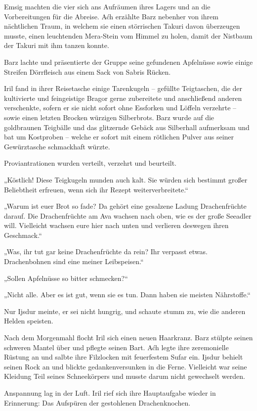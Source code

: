 Emsig machten die vier sich ans Aufräumen ihres Lagers und an die Vorbereitungen für die Abreise. Aćh erzählte Barz nebenher von ihrem nächtlichen Traum, in welchem sie einen störrischen Takuri davon überzeugen musste, einen leuchtenden Mera-Stein vom Himmel zu holen, damit der Nistbaum der Takuri mit ihm tanzen konnte.

Barz lachte und präsentierte der Gruppe seine gefundenen Apfelnüsse sowie einige Streifen Dörrfleisch aus einem Sack von Sabris Rücken.

Iril fand in ihrer Reisetasche einige Tarenkugeln – gefüllte Teigtaschen, die der kultivierte und feingeistige Bragor gerne zubereitete und anschließend anderen verschenkte, sofern er sie nicht sofort ohne Essforken und Löffeln verzehrte – sowie einen letzten Brocken würzigen Silberbrots. Barz wurde auf die goldbraunen Teigbälle und das glitzernde Gebäck aus Silberhall aufmerksam und bat um Kostproben – welche er sofort mit einem rötlichen Pulver aus seiner Gewürztasche schmackhaft würzte.

Proviantrationen wurden verteilt, verzehrt und beurteilt.

„Köstlich! Diese Teigkugeln munden auch kalt. Sie würden sich bestimmt großer Beliebtheit erfreuen, wenn sich ihr Rezept weiterverbreitete.“

„Warum ist euer Brot so fade? Da gehört eine gesalzene Ladung Drachenfrüchte darauf. Die Drachenfrüchte am Ava wachsen nach oben, wie es der große Seeadler will. Vielleicht wachsen eure hier nach unten und verlieren deswegen ihren Geschmack.“

„Was, ihr tut gar keine Drachenfrüchte da rein? Ihr verpasst etwas. Drachenbohnen sind eine meiner Leibspeisen.“

„Sollen Apfelnüsse so bitter schmecken?“

„Nicht alle. Aber es ist gut, wenn sie es tun. Dann haben sie meisten Nährstoffe.“

Nur Ijsdur meinte, er sei nicht hungrig, und schaute stumm zu, wie die anderen Helden speisten.

Nach dem Morgenmahl flocht Iril sich einen neuen Haarkranz. Barz stülpte seinen schweren Mantel über und pflegte seinen Bart. Aćh legte ihre zeremonielle Rüstung an und salbte ihre Filzlocken mit feuerfestem Sufar ein. Ijsdur behielt seinen Rock an und blickte gedankenversunken in die Ferne. Vielleicht war seine Kleidung Teil seines Schneekörpers und musste darum nicht gewechselt werden.

Anspannung lag in der Luft. Iril rief sich ihre Hauptaufgabe wieder in Erinnerung: Das Aufspüren der gestohlenen Drachenknochen.

